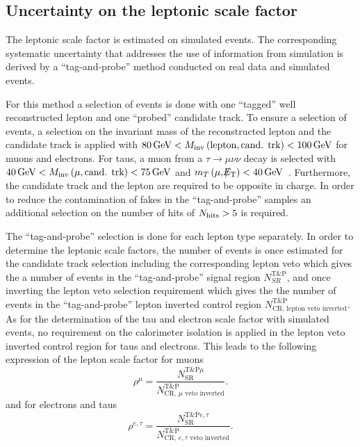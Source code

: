 \subsection{Uncertainty on the leptonic scale factor}
\label{sec:LeptonScaleUncertainty}

The leptonic scale factor \leptonscalefactor is estimated on simulated \WJets events.
The corresponding systematic uncertainty that addresses the use of information from simulation is derived by a ``tag-and-probe'' method conducted on real data and simulated events.

For this method a selection of \Zlep events is done with one ``tagged'' well reconstructed lepton and one ``probed'' candidate track.
To ensure a selection of \Zlep events, a selection on the invariant mass of  the reconstructed lepton and the candidate track is applied with $80\,\text{Ge}\kern-0.06667em\text{V}<M_{\text{inv}}\left( \text{lepton}, \text{cand. trk}  \right)<100\,\text{Ge}\kern-0.06667em\text{V}$ for muons and electrons.
For taus, a muon from a $\tau\rightarrow\mu\nu\nu$ decay is selected with $40\,\text{Ge}\kern-0.06667em\text{V}<M_{\text{inv}}\left( \mu, \text{cand. trk}  \right)<75\,\text{Ge}\kern-0.06667em\text{V}$ and $m_T\left(\mu,\slash\mkern-12mu{E}_{\text{T}}\right)<40\,\text{Ge}\kern-0.06667em\text{V}$~\cite{bib:CMS:DT_Thesis,bib:CMS:DT_8TeV_AN}.
Furthermore, the candidate track and the lepton are required to be opposite in charge.
In order to reduce the contamination of fakes in the ``tag-and-probe'' samples an additional selection on the number of hits of $N_{\text{hits}}>5$ is required.

The ``tag-and-probe'' selection is done for each lepton type separately.
In order to determine the leptonic scale factors, the number of events is once estimated for the candidate track selection including the corresponding lepton veto which gives the a number of events in the ``tag-and-probe'' signal region $N_{SR}^{\text{T\&P}}$, and once inverting the lepton veto selection requirement which gives the the number of events in the ``tag-and-probe'' lepton inverted control region $N_{\text{CR, lepton veto inverted}}^{\text{T\&P}}$.
As for the determination of the tau and electron scale factor with simulated \WJets events, no requirement on the calorimeter isolation is applied in the lepton veto inverted control region for taus and electrons.
This leads to the following expression of the lepton scale factor for muons
\begin{equation*}
\rho^{\mu} = \frac{N_{\text{SR}}^{\text{T\&P}\mu}}{N_{\text{CR, }\mu\text{ veto inverted}}^{\text{T\&P}}}.
\end{equation*}
and for electrons and taus 
\begin{equation*}
\rho^{e,\tau} = \frac{N_{\text{SR}}^{\text{T\&P}e,\tau}}{N_{\text{CR, }e,\tau \text{ veto inverted}}^{\text{T\&P}}}.
\end{equation*}

